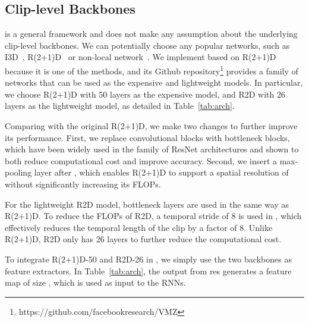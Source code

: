\documentclass[10pt,twocolumn,letterpaper]{article}
\begin{document}
{{\subsection{Clip-level Backbones}
\oursfr is a general framework and does not make any assumption about the underlying clip-level backbones. We can potentially choose any popular networks, such as I3D~\cite{carreira2017quo}, R(2+1)D~\cite{tran2018closer} or non-local network~\cite{wang2018non}. We implement \oursfr based on  R(2+1)D because it is one of the \sota methods, and its Github repository\footnote{https://github.com/facebookresearch/VMZ} provides a family of networks that can be used as the expensive and lightweight models. In particular, we choose R(2+1)D with 50 layers as the expensive model, and R2D with 26 layers as the lightweight model, as detailed in Table~\ref{tab:arch}.

Comparing with the original R(2+1)D, we make two changes to further improve its performance. First, we replace convolutional blocks with bottleneck blocks, which have been widely used in the family of ResNet architectures and shown to both reduce computational cost and improve accuracy. Second, we insert a max-pooling layer after , which enables R(2+1)D to support a spatial resolution of  without significantly increasing its FLOPs.  

For the lightweight R2D model, bottleneck layers are used in the same way as R(2+1)D. To reduce the FLOPs of R2D, a temporal stride of 8 is used in , which effectively reduces the temporal length of the clip by a factor of 8. Unlike R(2+1)D, R2D only has 26 layers to further reduce the computational cost.

To integrate R(2+1)D-50 and R2D-26 in \oursfr, we simply use the two backbones as feature extractors. In Table~\ref{tab:arch}, the output from res generates a feature map of size , which is used as input  to the RNNs.

}}
\end{document}
